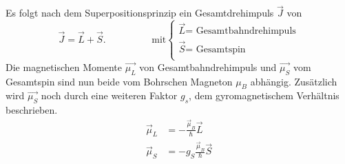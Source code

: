 Es folgt nach dem Superpositionsprinzip ein Gesamtdrehimpuls $\vec{J}$ von 
\begin{equation*}
    \vec{J} = \vec{L} +\vec{S}. \hspace{2cm}\text{mit}
    \begin{cases}
        \vec{L}\text{= Gesamtbahndrehimpuls}\\
        \vec{S}\text{= Gesamtspin}\\
    \end{cases}
\end{equation*}
Die magnetischen Momente $\vec{\mu_L}$ von Gesamtbahndrehimpuls und $\vec{\mu_S}$ vom Gesamtspin sind nun beide vom Bohrschen Magneton $\mu_B$ abhängig.
Zusätzlich wird $\vec{\mu_S}$ noch durch eine weiteren Faktor $g_s$, dem gyromagnetischem Verhältnis beschrieben.
\begin{align*}
    \vec{\mu}_L &= - \frac{\vec{\mu}_B}{\hbar}\vec{L} \\
    \vec{\mu}_S &= -g_S \frac{\vec{\mu}_B}{\hbar}\vec{S} 
\end{align*}
